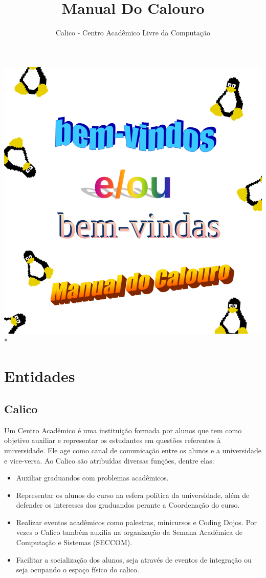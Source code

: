 \documentclass{article}
\title{Manual Do Calouro}
\author{Calico - Centro Acadêmico Livre da Computação}
\begin{document}
    \vspace{5cm}
    \includegraphics[width=\paperwidth,height=\paperheight,keepaspectratio]{capa}
    \vfill{*}
\restoregeometry

\maketitle
\tableofcontents

\clearpage

\section{Entidades} 
\subsection{Calico}
Um Centro Acadêmico é uma instituição formada por alunos que tem como objetivo auxiliar e representar os estudantes em questões referentes à universidade. Ele age como canal de comunicação entre os alunos e a universidade e vice-versa.
Ao Calico são atribuídas diversas funções, dentre elas:
\begin{itemize}
\item Auxiliar graduandos com problemas acadêmicos.
\item Representar os alunos do curso na esfera política da universidade, além de defender os interesses dos graduandos perante a Coordenação do curso.
\item Realizar eventos acadêmicos como palestras, minicursos e Coding Dojos. Por vezes o Calico também auxilia na organização da Semana Acadêmica de Computação e Sistemas (SECCOM).
\item Facilitar a socialização dos alunos, seja através de eventos de integração ou seja ocupando o espaço físico do calico.
\end{itemize}
 
\end{document}

